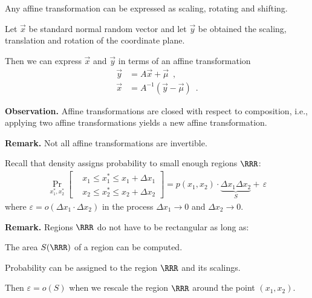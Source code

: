 \documentclass[landscape,footrule]{foils}
\newcommand{\lastline}{\vspace*{-2ex}}
\begin{document}
Any affine transformation can be expressed as scaling, rotating and shifting.





Let $\vec{x}$ be standard normal random vector and let $\vec{y}$ be obtained the scaling,  translation and rotation of the coordinate plane.

Then we can express $\vec{x}$ and $\vec{y}$ in terms of an affine transformation
\begin{align*}
  \vec{y}&=A\vec{x}+\vec{\mu} \enspace,\\
  \vec{x}&=A^{-1}(\vec{y}-\vec{\mu}) \enspace.
\end{align*}

\textbf{Observation.}
Affine transformations are closed with respect to composition, i.e., applying two affine transformations yields a new affine transformation. \vspace*{2ex}

\textbf{Remark.} Not all affine transformations are invertible.\lastline




Recall that density assigns probability to small enough regions $\RRR$:
\begin{align*}
\Pr_{x_1^*,x_2^*}
\left[\begin{aligned}
   &x_1\leq x_1^*\leq x_1+\Delta x_1\\ 
   &x_2\leq x_2^*\leq x_2+\Delta x_2
\end{aligned}\right]= p(x_1,x_2)\cdot\underbrace{\Delta x_1\Delta x_2}_S +\, \varepsilon
\end{align*}
where $\varepsilon=o(\Delta x_1\cdot\Delta x_2)$ in the process $\Delta x_1\to 0$ and $\Delta x_2\to 0$.\vspace*{1cm}

\textbf{Remark.} Regions $\RRR$ do not have to be rectangular as long as:
\begin{triangles}
\item The area $S(\RRR)$ of a region can be computed.  
\item Probability can be assigned to the region $\RRR$ and its scalings.
\end{triangles}
Then $\varepsilon=o(S)$ when we rescale the region $\RRR$ around the point $(x_1,x_2)$.


\end{document}
